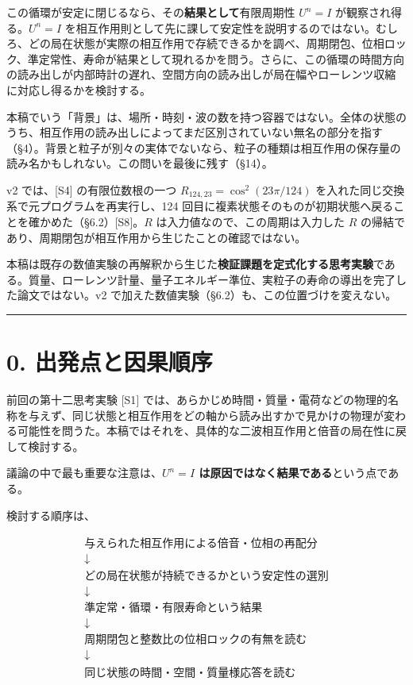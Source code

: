 \documentclass[
  a4paper,
]{ltjsarticle}
\begin{document}
この循環が安定に閉じるなら、その\textbf{結果として}有限周期性 \(U^n=I\)
が観察され得る。\(U^n=I\)
を相互作用則として先に課して安定性を説明するのではない。むしろ、どの局在状態が実際の相互作用で存続できるかを調べ、周期閉包、位相ロック、準定常性、寿命が結果として現れるかを問う。さらに、この循環の時間方向の読み出しが内部時計の遅れ、空間方向の読み出しが局在幅やローレンツ収縮に対応し得るかを検討する。

本稿でいう「背景」は、場所・時刻・波の数を持つ容器ではない。全体の状態のうち、相互作用の読み出しによってまだ区別されていない無名の部分を指す（§4）。背景と粒子が別々の実体でないなら、粒子の種類は相互作用の保存量の読み名かもしれない。この問いを最後に残す（§14）。

v2 では、{[}S4{]} の有限位数根の一つ \(R_{124,23}=\cos^2(23\pi/124)\)
を入れた同じ交換系で元プログラムを再実行し、124
回目に複素状態そのものが初期状態へ戻ることを確かめた（§6.2）{[}S8{]}。\(R\)
は入力値なので、この周期は入力した \(R\)
の帰結であり、周期閉包が相互作用から生じたことの確認ではない。

本稿は既存の数値実験の再解釈から生じた\textbf{検証課題を定式化する思考実験}である。質量、ローレンツ計量、量子エネルギー準位、実粒子の寿命の導出を完了した論文ではない。v2
で加えた数値実験（§6.2）も、この位置づけを変えない。

\begin{center}\rule{0.5\linewidth}{0.5pt}\end{center}

\section{0.
出発点と因果順序}\label{ux51faux767aux70b9ux3068ux56e0ux679cux9806ux5e8f}

前回の第十二思考実験 {[}S1{]}
では、あらかじめ時間・質量・電荷などの物理的名称を与えず、同じ状態と相互作用をどの軸から読み出すかで見かけの物理が変わる可能性を問うた。本稿ではそれを、具体的な二波相互作用と倍音の局在性に戻して検討する。

議論の中で最も重要な注意は、\textbf{\(U^n=I\)
は原因ではなく結果である}という点である。

検討する順序は、

\[
\begin{gathered}
\text{与えられた相互作用による倍音・位相の再配分}\\
\downarrow\\
\text{どの局在状態が持続できるかという安定性の選別}\\
\downarrow\\
\text{準定常・循環・有限寿命という結果}\\
\downarrow\\
\text{周期閉包と整数比の位相ロックの有無を読む}\\
\downarrow\\
\text{同じ状態の時間・空間・質量様応答を読む}
\end{gathered}
\]
\end{document}
